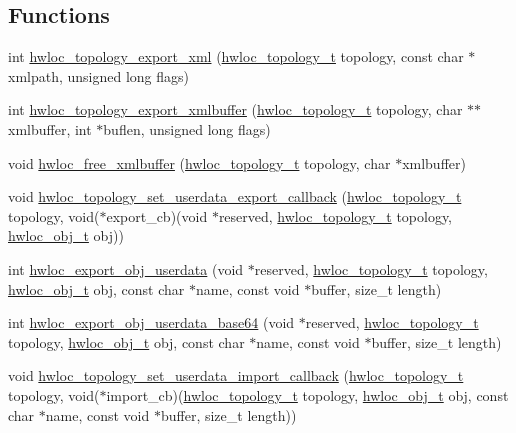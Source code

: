\subsection*{Functions}
\begin{DoxyCompactItemize}
\item 
int \hyperlink{a00206_ga333f79975b4eeb28a3d8fad3373583ce}{hwloc\+\_\+topology\+\_\+export\+\_\+xml} (\hyperlink{a00186_ga9d1e76ee15a7dee158b786c30b6a6e38}{hwloc\+\_\+topology\+\_\+t} topology, const char $\ast$xmlpath, unsigned long flags)
\item 
int \hyperlink{a00206_gad33b7f7c11db10459505a3b1634fd3f1}{hwloc\+\_\+topology\+\_\+export\+\_\+xmlbuffer} (\hyperlink{a00186_ga9d1e76ee15a7dee158b786c30b6a6e38}{hwloc\+\_\+topology\+\_\+t} topology, char $\ast$$\ast$xmlbuffer, int $\ast$buflen, unsigned long flags)
\item 
void \hyperlink{a00206_ga293e4a6489f15fd16ad22a5734561cf1}{hwloc\+\_\+free\+\_\+xmlbuffer} (\hyperlink{a00186_ga9d1e76ee15a7dee158b786c30b6a6e38}{hwloc\+\_\+topology\+\_\+t} topology, char $\ast$xmlbuffer)
\item 
void \hyperlink{a00206_ga9d6ff0f7a8dd45be9aa8575ef31978cc}{hwloc\+\_\+topology\+\_\+set\+\_\+userdata\+\_\+export\+\_\+callback} (\hyperlink{a00186_ga9d1e76ee15a7dee158b786c30b6a6e38}{hwloc\+\_\+topology\+\_\+t} topology, void($\ast$export\+\_\+cb)(void $\ast$reserved, \hyperlink{a00186_ga9d1e76ee15a7dee158b786c30b6a6e38}{hwloc\+\_\+topology\+\_\+t} topology, \hyperlink{a00185_ga79b8ab56877ef99ac59b833203391c7d}{hwloc\+\_\+obj\+\_\+t} obj))
\item 
int \hyperlink{a00206_gaa541bdd628416dbbe97d0df69d3de958}{hwloc\+\_\+export\+\_\+obj\+\_\+userdata} (void $\ast$reserved, \hyperlink{a00186_ga9d1e76ee15a7dee158b786c30b6a6e38}{hwloc\+\_\+topology\+\_\+t} topology, \hyperlink{a00185_ga79b8ab56877ef99ac59b833203391c7d}{hwloc\+\_\+obj\+\_\+t} obj, const char $\ast$name, const void $\ast$buffer, size\+\_\+t length)
\item 
int \hyperlink{a00206_ga1b7358137cec27bd073f58a606ecbaba}{hwloc\+\_\+export\+\_\+obj\+\_\+userdata\+\_\+base64} (void $\ast$reserved, \hyperlink{a00186_ga9d1e76ee15a7dee158b786c30b6a6e38}{hwloc\+\_\+topology\+\_\+t} topology, \hyperlink{a00185_ga79b8ab56877ef99ac59b833203391c7d}{hwloc\+\_\+obj\+\_\+t} obj, const char $\ast$name, const void $\ast$buffer, size\+\_\+t length)
\item 
void \hyperlink{a00206_ga5ac6917ea7289955fb1ffda4353af9b0}{hwloc\+\_\+topology\+\_\+set\+\_\+userdata\+\_\+import\+\_\+callback} (\hyperlink{a00186_ga9d1e76ee15a7dee158b786c30b6a6e38}{hwloc\+\_\+topology\+\_\+t} topology, void($\ast$import\+\_\+cb)(\hyperlink{a00186_ga9d1e76ee15a7dee158b786c30b6a6e38}{hwloc\+\_\+topology\+\_\+t} topology, \hyperlink{a00185_ga79b8ab56877ef99ac59b833203391c7d}{hwloc\+\_\+obj\+\_\+t} obj, const char $\ast$name, const void $\ast$buffer, size\+\_\+t length))
\end{DoxyCompactItemize}


